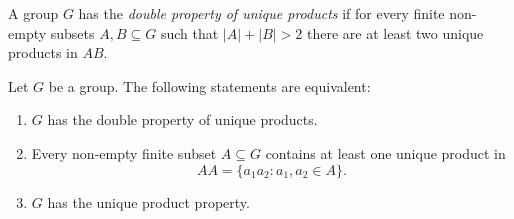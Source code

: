 
\begin{definition}
	A group $G$ has the \emph{double property of unique products} 
	if for every finite non-empty subsets $A,B\subseteq G$ such that 
	$|A|+|B|>2$ there are at least two unique products in $AB$.
\end{definition}

\begin{theorem}[Strojnowski]
	\label{theorem:Strojnowski}
	Let $G$ be a group. The following statements are equivalent:
	\begin{enumerate}
		\item $G$ has the double property of unique products. 
		\item Every non-empty finite subset $A\subseteq G$ contains at least one unique product 
			in 
   \[
   AA=\{a_1a_2:a_1,a_2\in A\}.
   \]
		\item $G$ has the unique product property.
	\end{enumerate}
\end{theorem}

